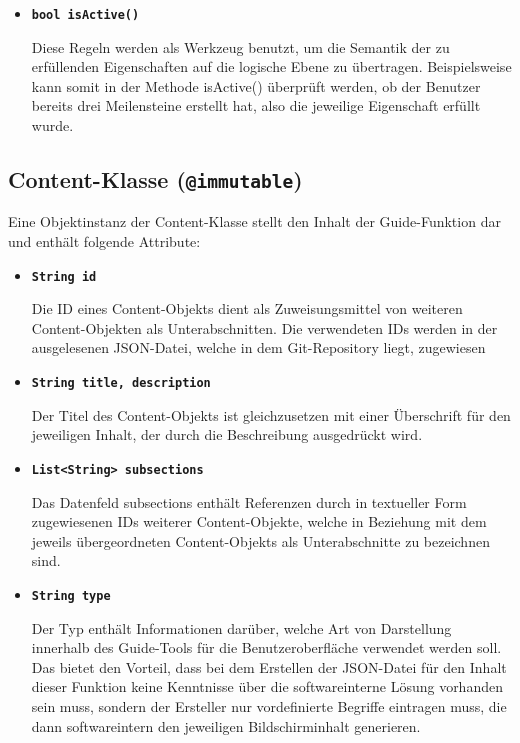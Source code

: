 \documentclass[bibliography=totoc,listof=totoc,BCOR=5mm,DIV=12,oneside]{scrbook}
\begin{document}
{\begin{itemize}
\item[] \texttt{\textbf{bool isActive()}}
\par Diese Regeln werden als Werkzeug benutzt, um die Semantik der zu erfüllenden Eigenschaften auf die logische Ebene zu übertragen.
Beispielsweise kann somit in der Methode isActive() überprüft werden, ob der Benutzer bereits drei Meilensteine erstellt hat, also die jeweilige Eigenschaft erfüllt wurde.

\end{itemize}

\subsection{Content-Klasse (\texttt{@immutable})}
\par Eine Objektinstanz der Content-Klasse stellt den Inhalt der \grqq Guide\grqq -Funktion dar und enthält folgende Attribute:
\begin{itemize}

\item[] \texttt{\textbf{String id}}
\par Die ID eines Content-Objekts dient als Zuweisungsmittel von weiteren Content-Objekten als Unterabschnitten. Die verwendeten IDs werden in der ausgelesenen JSON-Datei, welche in dem Git-Repository liegt, zugewiesen

\item[] \texttt{\textbf{String title, description}}
\par Der Titel des Content-Objekts ist gleichzusetzen mit einer Überschrift für den jeweiligen Inhalt, der durch die Beschreibung ausgedrückt wird.

\item[] \texttt{\textbf{List<String> subsections}}
\par Das Datenfeld subsections enthält Referenzen durch in textueller Form zugewiesenen IDs weiterer Content-Objekte, welche in Beziehung mit dem jeweils übergeordneten Content-Objekts als Unterabschnitte zu bezeichnen sind.

\item[] \texttt{\textbf{String type}}
\par Der Typ enthält Informationen darüber, welche Art von Darstellung innerhalb des \grqq Guide\grqq -Tools für die Benutzeroberfläche verwendet werden soll. Das bietet den Vorteil, dass bei dem Erstellen der JSON-Datei für den Inhalt dieser Funktion keine Kenntnisse über die softwareinterne Lösung vorhanden sein muss, sondern der Ersteller nur vordefinierte Begriffe eintragen muss, die dann softwareintern den jeweiligen Bildschirminhalt generieren.
\end{itemize}

}
\end{document}
